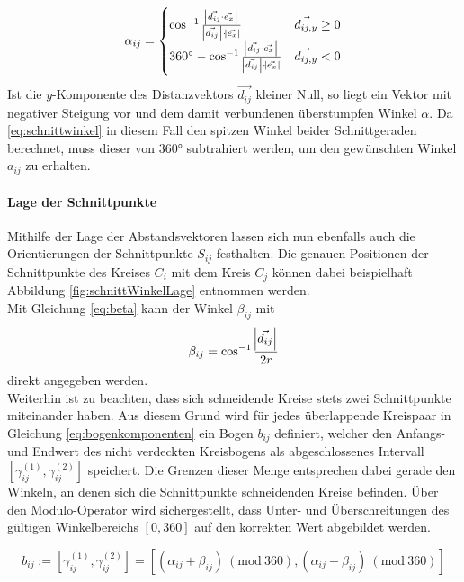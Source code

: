 \documentclass[accentcolor=tud1c, 11pt, toc=bib, toc=listof, captions=abovetable, parskip=half]{tudreport}
\newcommand{\Mod}[1]{\ (\mathrm{mod}\ #1)}
\begin{document}
\begin{equation} 
\alpha_{ij} = \begin{cases} 
      \cos^{-1}{\frac{\abs{\vec{d_{ij}}\cdot\vec{e_x}}}{\abs{\vec{d_{ij}}}\cdot\abs{\vec{e_x}}}} & \vec{d_{ij,y}}\geq 0 \\
      \ang{360} - \cos^{-1}{\frac{\abs{\vec{d_{ij}}\cdot\vec{e_x}}}{\abs{\vec{d_{ij}}}\cdot\abs{\vec{e_x}}}} & \vec{d_{ij,y}} < 0 \\
   \end{cases}
\label{eq:schnittWinkelBereichserweiterung}
\end{equation}
Ist die $y$-Komponente des Distanzvektors $\vec{d_{ij}}$ kleiner Null, so liegt ein Vektor mit negativer Steigung vor und dem damit verbundenen überstumpfen Winkel $\alpha$. Da \ref{eq:schnittwinkel} in diesem Fall den spitzen Winkel beider Schnittgeraden berechnet, muss dieser von $\ang{360}$ subtrahiert werden, um den gewünschten Winkel $a_{ij}$ zu erhalten.

\paragraph{Lage der Schnittpunkte}
Mithilfe der Lage der Abstandsvektoren lassen sich nun ebenfalls auch die Orientierungen der Schnittpunkte $S_{ij}$ festhalten. Die genauen Positionen der Schnittpunkte des Kreises $C_i$ mit dem Kreis $C_j$ können dabei beispielhaft Abbildung \ref{fig:schnittWinkelLage} entnommen werden. \\
Mit Gleichung \ref{eq:beta} kann der Winkel $\beta_{ij}$ mit 
\begin{equation}
\beta_{ij} = \cos^{-1}\frac{\abs{\vec{d_{ij}}}}{2r}
\end{equation}
direkt angegeben werden.\\

Weiterhin ist zu beachten, dass sich schneidende Kreise stets zwei Schnittpunkte miteinander haben. Aus diesem Grund wird für jedes überlappende Kreispaar in Gleichung \ref{eq:bogenkomponenten} ein Bogen $b_{ij}$ definiert, welcher den Anfangs- und Endwert des nicht verdeckten Kreisbogens als abgeschlossenes Intervall $[\gamma_{ij}^{(1)}, \gamma_{ij}^{(2)}]$ speichert. Die Grenzen dieser Menge entsprechen dabei gerade den Winkeln, an denen sich die Schnittpunkte schneidenden Kreise befinden. Über den Modulo-Operator wird sichergestellt, dass Unter- und Überschreitungen des gültigen Winkelbereichs $[0,360]$ auf den korrekten Wert abgebildet werden. 

\begin{equation} 
b_{ij} := \left[ {\gamma _{ij}^{(1)},\gamma_{ij}^{(2)}} \right] 
=\left[{ (\alpha_{ij} + \beta_{ij}) \Mod{360}, (\alpha_{ij} - \beta_{ij}) \Mod{360} }\right] 
\label{eq:bogenkomponenten}
\end{equation}
\end{document}
